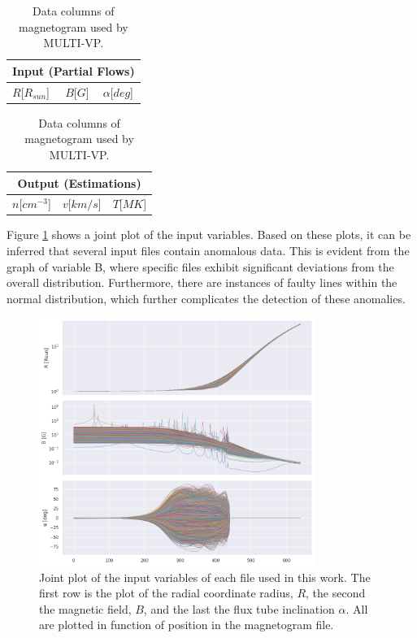 \begin{table}[ht]
    \caption{Data columns of magnetogram used by MULTI-VP.}
    \label{tab:multivp_columns}
    \begin{subtable}[h]{0.32\textwidth}
        \centering
        \begin{tabular}{lcc}
        \hline
        \multicolumn{3}{c}{Input (Partial Flows)}                              \\ \hline
        $R${[}$R_{sun}${]} & $B${[}$G${]} & $\alpha${[}$deg${]} \\ \hline
        \end{tabular}
    \end{subtable}
    \begin{subtable}[h]{0.32\textwidth}
        \centering
        \begin{tabular}{ccc}
        \hline
        \multicolumn{3}{c}{Output (Estimations)}                           \\ \hline
        $n${[}$cm^{-3}${]} & $v${[}$km/s${]} & $T${[}$MK${]} \\ \hline
        \end{tabular}
    \end{subtable}
\end{table}


Figure \ref{fig:jointplot_input} shows a joint plot of the input variables. Based on these plots, it can be inferred that several input files contain anomalous data. This is evident from the graph of variable B, where specific files exhibit significant deviations from the overall distribution. Furthermore, there are instances of faulty lines within the normal distribution, which further complicates the detection of these anomalies.


\begin{figure}
    \centering
    \includegraphics[width=0.8\textwidth]{figures/joint_input_cols.png}
    \caption{Joint plot of the input variables of each file used in this work. The first row is the plot of the radial coordinate radius, $R$, the second the magnetic field, $B$, and the last the flux tube inclination $\alpha$. All are plotted in function of position in the magnetogram file.}
    \label{fig:jointplot_input}
\end{figure}

